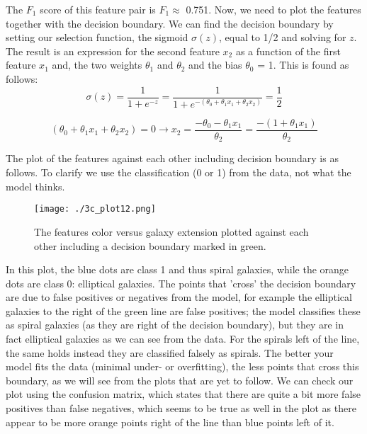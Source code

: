 The $F_1$ score of this feature pair is $F_1 \approx$ 0.751. Now, we need to plot the features together with the decision boundary. We can find the decision boundary by setting our selection function, the sigmoid $\sigma(z)$, equal to 1/2 and solving for $z$. The result is an expression for the second feature $x_2$ as a function of the first feature $x_1$ and, the two weights $\theta_1$ and $\theta_2$ and the bias $\theta_0$ = 1. This is found as follows:\\

\begin{equation}
\sigma(z) = \frac{1}{1 + e^{-z}} =  \frac{1}{1 + e^{-(\theta_0 + \theta_1 x_1 + \theta_2 x_2)}} = \frac{1}{2}
\end{equation}

\begin{equation}
(\theta_0 + \theta_1 x_1 + \theta_2 x_2) = 0 \rightarrow x_2 = \frac{-\theta_0 - \theta_1 x_1}{\theta_2} = \frac{-(1 + \theta_1 x_1)}{\theta_2}
\end{equation}

The plot of the features against each other including decision boundary is as follows. To clarify we use the classification (0 or 1) from the data, not what the model thinks.\\

\begin{figure}[h!]
  \centering
  \texttt{[image: ./3c\_plot12.png]}
  \caption{The features color versus galaxy extension plotted against each other including a decision boundary marked in green.}
\end{figure}

In this plot, the blue dots are class 1 and thus spiral galaxies, while the orange dots are class 0: elliptical galaxies. The points that 'cross' the decision boundary are due to false positives or negatives from the model, for example the elliptical galaxies to the right of the green line are false positives; the model classifies these as spiral galaxies (as they are right of the decision boundary), but they are in fact elliptical galaxies as we can see from the data. For the spirals left of the line, the same holds instead they are classified falsely as spirals. The better your model fits the data (minimal under- or overfitting), the less points that cross this boundary, as we will see from the plots that are yet to follow. We can check our plot using the confusion matrix, which states that there are quite a bit more false positives than false negatives, which seems to be true as well in the plot as there appear to be more orange points right of the line than blue points left of it. 




